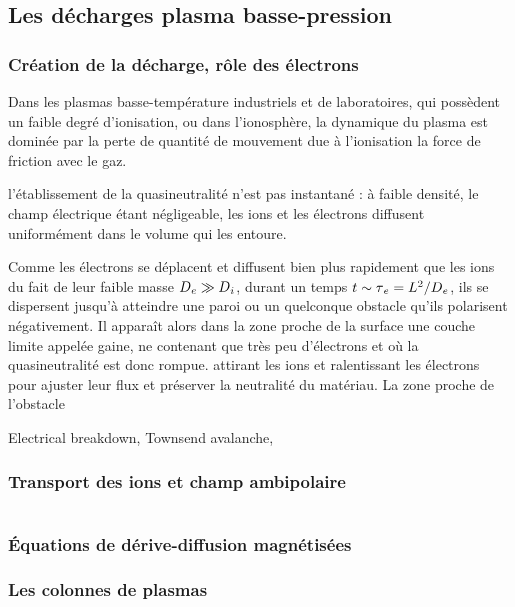 \begin{refsection}
\subsection{Les décharges plasma basse-pression}
\label{1-transportAmbipolaire}

\subsubsection{Création de la décharge, rôle des électrons}

Dans les plasmas basse-température industriels et de laboratoires, qui
possèdent un faible degré d'ionisation, ou dans l'ionosphère, la dynamique du
plasma est dominée par la perte de quantité de mouvement due à l'ionisation la force de friction avec
le gaz.

l'établissement de la quasineutralité n'est pas instantané : à faible densité,
le champ électrique étant négligeable, les ions et les électrons diffusent
uniformément dans le volume qui les entoure.

Comme les électrons se déplacent et diffusent bien plus rapidement que les ions
du fait de leur faible masse $D{_{e}}\gg D{_{i}}$, durant un temps
$t\sim \tau{_{e}}=L^{{2}}/D{_{e}}$, ils se dispersent jusqu'à atteindre
une paroi ou un quelconque obstacle qu'ils polarisent négativement. Il apparaît
alors dans la zone proche de la surface une couche limite appelée gaine, ne
contenant que très peu d'électrons et où la quasineutralité est donc rompue. 
attirant les ions et ralentissant les électrons pour ajuster leur flux et
préserver la neutralité du matériau. La zone proche de l'obstacle



Electrical breakdown, Townsend avalanche,
\subsubsection{Transport des ions et champ ambipolaire}
\begin{equation}
\label{derivediffusion}
\end{equation}
\subsubsection{Équations de dérive-diffusion magnétisées}

\subsubsection{Les colonnes de plasmas}


\end{refsection}
